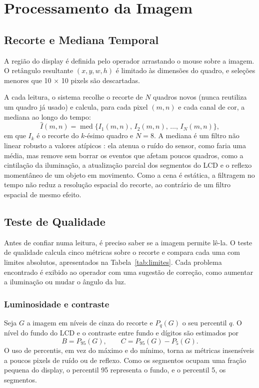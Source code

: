 \documentclass[10pt,twocolumn,letterpaper]{article}
\DeclareMathOperator{\med}{med}
\begin{document}
\section{Processamento da Imagem}

\subsection{Recorte e Mediana Temporal}

A região do display é definida pelo operador arrastando o mouse sobre a imagem.
O retângulo resultante $(x, y, w, h)$ é limitado às dimensões do quadro, e
seleções menores que 10 × 10 pixels são descartadas.

A cada leitura, o sistema recolhe o recorte de $N$ quadros novos (nunca reutiliza
um quadro já usado) e calcula, para cada pixel $(m, n)$ e cada canal de cor, a
mediana ao longo do tempo:
\begin{equation}
  \hat{I}(m,n) = \med\{I_1(m,n),\, I_2(m,n),\, \ldots,\, I_N(m,n)\},
  \label{eq:mediana}
\end{equation}
em que $I_k$ é o recorte do $k$-ésimo quadro e $N = 8$. A mediana é um filtro
não linear robusto a valores atípicos \cite{huang}: ela atenua o ruído do
sensor, como faria uma média, mas remove sem borrar os eventos que afetam
poucos quadros, como a cintilação da iluminação, a atualização parcial dos
segmentos do LCD e o reflexo momentâneo de um objeto em movimento. Como a cena
é estática, a filtragem no tempo não reduz a resolução espacial do recorte, ao
contrário de um filtro espacial de mesmo efeito.

\subsection{Teste de Qualidade}

Antes de confiar numa leitura, é preciso saber se a imagem permite lê-la. O
teste de qualidade calcula cinco métricas sobre o recorte e compara cada uma
com limites absolutos, apresentados na Tabela~\ref{tab:limites}. Cada problema
encontrado é exibido ao operador com uma sugestão de correção, como aumentar a
iluminação ou mudar o ângulo da luz.

\subsubsection{Luminosidade e contraste}
Seja $G$ a imagem em níveis de cinza do recorte e $P_q(G)$ o seu percentil $q$.
O nível do fundo do LCD e o contraste entre fundo e dígitos são estimados por
\begin{equation}
  B = P_{95}(G), \qquad C = P_{95}(G) - P_{5}(G).
  \label{eq:contraste}
\end{equation}
O uso de percentis, em vez do máximo e do mínimo, torna as métricas insensíveis
a poucos pixels de ruído ou de reflexo. Como os segmentos ocupam uma fração
pequena do display, o percentil 95 representa o fundo, e o percentil 5, os
segmentos.
\end{document}
